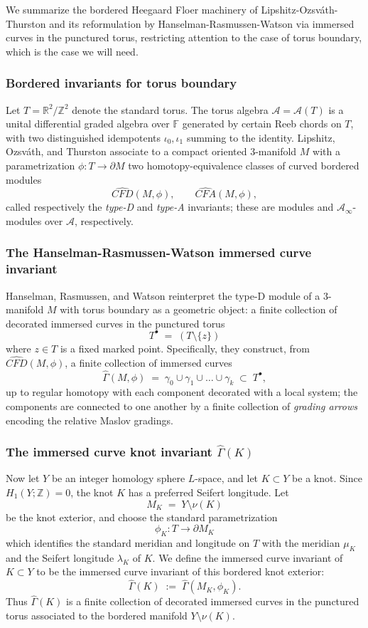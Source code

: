 \documentclass[12pt]{amsart}
\theoremstyle{definition}
\theoremstyle{definition}
\newcommand{\F}{{\mathbb{F}}}
\newcommand{\R}{{\mathbb{R}}}
\newcommand{\Z}{{\mathbb{Z}}}
\newcommand{\Gh}{\widehat{\Gamma}}
\newcommand{\Tpun}{T^{\bullet}}
\newcommand{\CFDhat}{\widehat{CFD}}
\newcommand{\CFAhat}{\widehat{CFA}}
\begin{document}
We summarize the bordered Heegaard Floer machinery of
Lipshitz-Ozsv\'ath-Thurston \cite{LOT} and its reformulation by
Hanselman-Rasmussen-Watson \cite{HRW1,HRW2} via immersed curves in
the punctured torus, restricting attention to the case of torus
boundary, which is the case we will need.
 
\subsubsection*{Bordered invariants for torus boundary}
 
Let $T = \R^2 / \Z^2$ denote the standard torus. The torus algebra
$\mathcal{A} = \mathcal{A}(T)$ is a unital differential graded algebra
over $\F$ generated by certain Reeb chords on $T$, with two distinguished
idempotents $\iota_0, \iota_1$ summing to the identity. Lipshitz, Ozsv\'ath,
and Thurston associate to a compact oriented 3-manifold $M$ with a
parametrization $\phi : T \to \partial M$ two homotopy-equivalence
classes of curved bordered modules
\[
\CFDhat(M, \phi), \qquad \CFAhat(M, \phi),
\]
called respectively the \emph{type-D} and \emph{type-A} invariants;
these are modules and $\mathcal{A}_\infty$-modules over $\mathcal{A}$, respectively.
\subsubsection*{The Hanselman-Rasmussen-Watson immersed curve invariant}
 
Hanselman, Rasmussen, and Watson \cite{HRW1, HRW2} reinterpret the type-D
module of a 3-manifold $M$ with torus boundary as a geometric object: a
finite collection of decorated immersed curves in the punctured torus
\[
T^{\bullet} \;=\; (T \setminus \{z\})
\]
where $z \in T$ is a fixed marked point. Specifically, they construct,
from $\CFDhat(M, \phi)$, a finite collection  of
immersed curves
\[
\Gh(M, \phi) \;=\; \gamma_0 \cup \gamma_1 \cup \dots \cup \gamma_k \;\subset\; \Tpun,
\]
up to regular homotopy with each component decorated with a local system; the components are connected to one another by a finite
collection of \emph{grading arrows} encoding the relative Maslov gradings.

\subsubsection*{The immersed curve knot invariant $\Gh(K)$}

Now let $Y$ be an integer homology sphere $L$-space, and let
$K \subset Y$ be a knot. Since $H_1(Y;\Z)=0$, the knot $K$ has a preferred
Seifert longitude. Let
\[
M_K \;=\; Y \setminus \nu(K)
\]
be the knot exterior, and choose the standard parametrization
\[
\phi_K : T \longrightarrow \partial M_K
\]
which identifies the standard meridian and longitude on $T$ with the meridian
$\mu_K$ and the Seifert longitude $\lambda_K$ of $K$. We define the immersed
curve invariant of $K \subset Y$ to be the immersed curve invariant of this
bordered knot exterior:
\[
\Gh(K) \;:=\; \Gh(M_K,\phi_K).
\]
Thus $\Gh(K)$ is a finite collection of decorated immersed curves in the
punctured torus associated to the bordered manifold $Y \setminus \nu(K)$.
\end{document}
